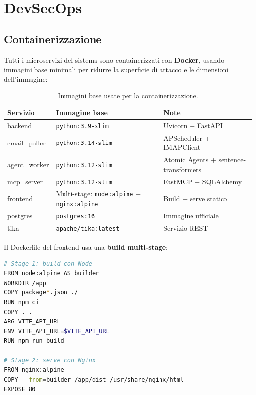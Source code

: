 \chapter{DevSecOps}
\label{chap:devsecops}

\section{Containerizzazione}
\label{sec:containerizzazione}

Tutti i microservizi del sistema sono containerizzati con \textbf{Docker}, usando
immagini base minimali per ridurre la superficie di attacco e le dimensioni dell'immagine:

\begin{table}[ht]
\centering
\small
\begin{tabularx}{\linewidth}{l l l}
\toprule
\textbf{Servizio} & \textbf{Immagine base} & \textbf{Note} \\
\midrule
backend       & \texttt{python:3.9-slim}  & Uvicorn + FastAPI \\
email\_poller & \texttt{python:3.14-slim} & APScheduler + IMAPClient \\
agent\_worker & \texttt{python:3.12-slim} & Atomic Agents + sentence-transformers \\
mcp\_server   & \texttt{python:3.12-slim} & FastMCP + SQLAlchemy \\
frontend      & Multi-stage: \texttt{node:alpine} + \texttt{nginx:alpine} & Build + serve statico \\
postgres      & \texttt{postgres:16}      & Immagine ufficiale \\
tika          & \texttt{apache/tika:latest} & Servizio REST \\
\bottomrule
\end{tabularx}
\caption{Immagini base usate per la containerizzazione.}
\label{tab:docker_images}
\end{table}

Il Dockerfile del frontend usa una \textbf{build multi-stage}:

\begin{lstlisting}[language=bash, caption={Struttura del Dockerfile multi-stage del frontend.}]
# Stage 1: build con Node
FROM node:alpine AS builder
WORKDIR /app
COPY package*.json ./
RUN npm ci
COPY . .
ARG VITE_API_URL
ENV VITE_API_URL=$VITE_API_URL
RUN npm run build

# Stage 2: serve con Nginx
FROM nginx:alpine
COPY --from=builder /app/dist /usr/share/nginx/html
EXPOSE 80
\end{lstlisting}

